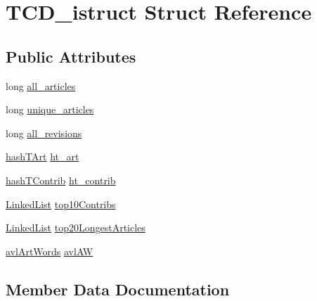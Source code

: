 \hypertarget{structTCD__istruct}{}\section{T\+C\+D\+\_\+istruct Struct Reference}
\label{structTCD__istruct}
\subsection*{Public Attributes}
\begin{DoxyCompactItemize}
\item 
long \hyperlink{structTCD__istruct_a4c1dc8a3178e77f3da75df599240af45}{all\+\_\+articles}
\item 
long \hyperlink{structTCD__istruct_a9da24baac897176a33d49d099dbdd96d}{unique\+\_\+articles}
\item 
long \hyperlink{structTCD__istruct_a2c71cee2a7b49119347ea3bb75699096}{all\+\_\+revisions}
\item 
\hyperlink{hashTArt_8h_a9c29e263aee730e17fcb7b85a2ab05b0}{hash\+T\+Art} \hyperlink{structTCD__istruct_a5ec7530b3212864efdc20753948265ca}{ht\+\_\+art}
\item 
\hyperlink{hashTContrib_8h_a2d4cbdc8189a569f5fc4890fe1d84ef3}{hash\+T\+Contrib} \hyperlink{structTCD__istruct_a8fb49b7e545d79bb8a1f0a75a8e5f466}{ht\+\_\+contrib}
\item 
\hyperlink{linkedList_8h_a2266b5434491632a8342c9f636f413c6}{Linked\+List} \hyperlink{structTCD__istruct_a83ca2148dbfd4909aad477931c1bb8c3}{top10\+Contribs}
\item 
\hyperlink{linkedList_8h_a2266b5434491632a8342c9f636f413c6}{Linked\+List} \hyperlink{structTCD__istruct_a06bb74736a9c7fb8a0d8ddbbc0ef58e3}{top20\+Longest\+Articles}
\item 
\hyperlink{avl_8h_a04eef13e46b719914a0c48f282ad1306}{avl\+Art\+Words} \hyperlink{structTCD__istruct_a66a417f76adfde802404bd058acfd824}{avl\+AW}
\end{DoxyCompactItemize}


\subsection{Member Data Documentation}
\mbox{\label{structTCD__istruct_a4c1dc8a3178e77f3da75df599240af45}} 
